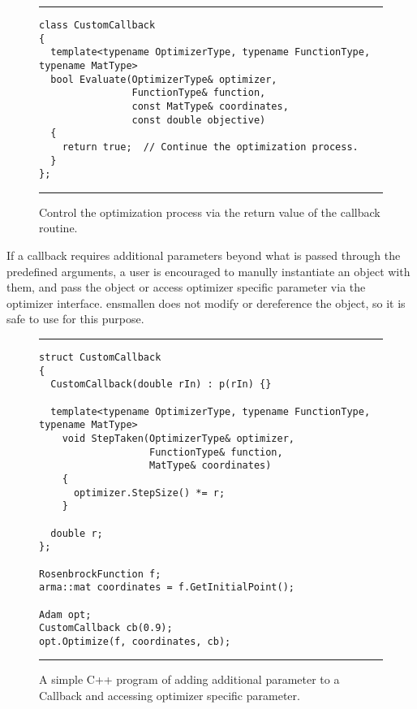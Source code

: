 \begin{figure}[H]
\centering
\hrule
\vspace{1ex}
\begin{adjustbox}{minipage=\columnwidth,scale={0.90}{0.85}}
\begin{verbatim}
class CustomCallback
{
  template<typename OptimizerType, typename FunctionType, typename MatType>
  bool Evaluate(OptimizerType& optimizer,
                FunctionType& function,
                const MatType& coordinates,
                const double objective)
  {
    return true;  // Continue the optimization process.
  }
};
\end{verbatim}
\end{adjustbox}
\vspace{1ex}
\hrule
\caption
  {
  Control the optimization process via the return value of the callback routine.
  }
\label{fig:example_prog_callbacks}
\end{figure}

If a callback requires additional parameters beyond what is passed through
the predefined arguments, a user is encouraged to manully instantiate an object
with them, and pass the object or access optimizer specific parameter via the
optimizer interface. ensmallen does not modify or dereference the object, so it
is safe to use for this purpose.

\begin{figure}[H]
\centering
\hrule
\vspace{1ex}
\begin{adjustbox}{minipage=\columnwidth,scale={0.90}{0.85}}
\begin{verbatim}
struct CustomCallback
{
  CustomCallback(double rIn) : p(rIn) {}

  template<typename OptimizerType, typename FunctionType, typename MatType>
    void StepTaken(OptimizerType& optimizer,
                   FunctionType& function,
                   MatType& coordinates)
    {
      optimizer.StepSize() *= r;
    }

  double r;
};

RosenbrockFunction f;
arma::mat coordinates = f.GetInitialPoint();

Adam opt;
CustomCallback cb(0.9);
opt.Optimize(f, coordinates, cb);
\end{verbatim}
\end{adjustbox}
\vspace{1ex}
\hrule
\caption
  {
  A simple C++ program of adding additional parameter to a Callback and accessing optimizer specific parameter.
  }
\label{fig:example_prog_callbacks_parameter}
\end{figure}


